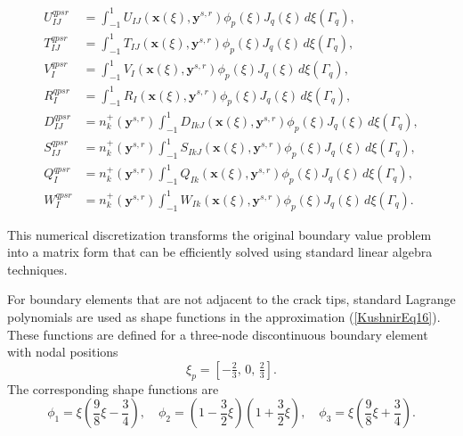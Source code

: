 \begin{equation}
	\begin{aligned}
		U_{IJ}^{qpsr}
		&=
		\int_{-1}^{1}
		U_{IJ}(\mathbf{x}(\xi),\mathbf{y}^{s,r})
		\phi_{p}(\xi)
		J_{q}(\xi)
		\,d\xi(\Gamma_{q}),
		\\
		T_{IJ}^{qpsr}
		&=
		\int_{-1}^{1}
		T_{IJ}(\mathbf{x}(\xi),\mathbf{y}^{s,r})
		\phi_{p}(\xi)
		J_{q}(\xi)
		\,d\xi(\Gamma_{q}),
		\\ 
		V_{I}^{qpsr}
		&=
		\int_{-1}^{1}
		V_{I}(\mathbf{x}(\xi),\mathbf{y}^{s,r})
		\phi_{p}(\xi)
		J_{q}(\xi)
		\,d\xi(\Gamma_{q}),
		\\ 
		R_{I}^{qpsr}
		&=
		\int_{-1}^{1}
		R_{I}(\mathbf{x}(\xi),\mathbf{y}^{s,r})
		\phi_{p}(\xi)
		J_{q}(\xi)
		\,d\xi(\Gamma_{q}),
		\\ 
		D_{IJ}^{qpsr}
		&=
		n_{k}^{+}(\mathbf{y}^{s,r})
		\int_{-1}^{1}
		D_{IkJ}(\mathbf{x}(\xi),\mathbf{y}^{s,r})
		\phi_{p}(\xi)
		J_{q}(\xi)
		\,d\xi(\Gamma_{q}),
		\\ 
		S_{IJ}^{qpsr}
		&=
		n_{k}^{+}(\mathbf{y}^{s,r})
		\int_{-1}^{1}
		S_{IkJ}(\mathbf{x}(\xi),\mathbf{y}^{s,r})
		\phi_{p}(\xi)
		J_{q}(\xi)
		\,d\xi(\Gamma_{q}),
		\\ 
		Q_{I}^{qpsr}
		&=
		n_{k}^{+}(\mathbf{y}^{s,r})
		\int_{-1}^{1}
		Q_{Ik}(\mathbf{x}(\xi),\mathbf{y}^{s,r})
		\phi_{p}(\xi)
		J_{q}(\xi)
		\,d\xi(\Gamma_{q}),
		\\ 
		W_{I}^{qpsr}
		&=
		n_{k}^{+}(\mathbf{y}^{s,r})
		\int_{-1}^{1}
		W_{Ik}(\mathbf{x}(\xi),\mathbf{y}^{s,r})
		\phi_{p}(\xi)
		J_{q}(\xi)
		\,d\xi(\Gamma_{q}).
	\end{aligned}
	\label{KushnirEq22}
\end{equation}

This numerical discretization transforms the original boundary value
problem into a matrix form that can be efficiently solved using standard
linear algebra techniques.

For boundary elements that are not adjacent to the crack tips, standard
Lagrange polynomials are used as shape functions in the approximation
(\ref{KushnirEq16}). These functions are defined for a three-node
discontinuous boundary element with nodal positions
\[
\xi_{p}=\left[-\tfrac{2}{3},\,0,\,\tfrac{2}{3}\right].
\]
The corresponding shape functions are
\begin{equation}
	\phi_{1}=\xi\!\left(\frac{9}{8}\xi-\frac{3}{4}\right),\quad
	\phi_{2}=\left(1-\frac{3}{2}\xi\right)\!\left(1+\frac{3}{2}\xi\right),\quad
	\phi_{3}=\xi\!\left(\frac{9}{8}\xi+\frac{3}{4}\right).
	\label{KushnirEq23}
\end{equation}

